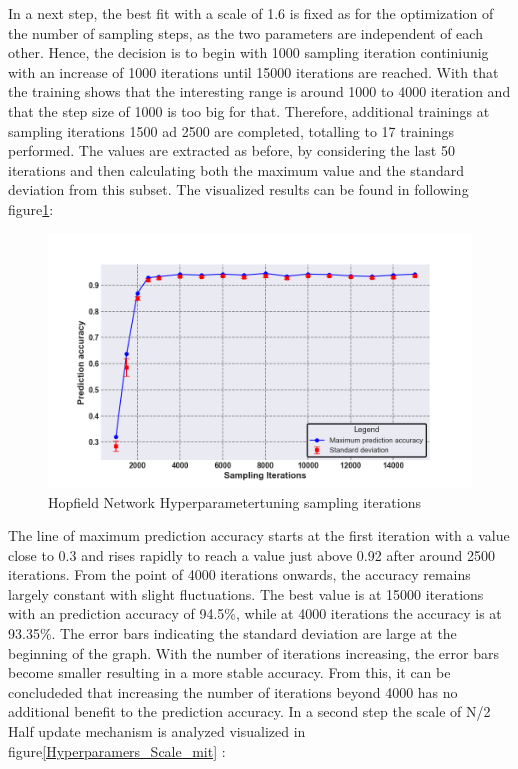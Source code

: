 In a next step, the best fit with a scale of 1.6 is fixed as for the optimization of the number of sampling steps, as the two parameters are independent of each other. 
Hence, the decision is to begin with 1000 sampling iteration continiunig with an increase of 1000 iterations until 15000 iterations are reached. 
With that the training shows that the interesting range is around 1000 to 4000 iteration and that the step size of 1000 is too big for that. 
Therefore, additional trainings at sampling iterations 1500 ad 2500 are completed, totalling to 17 trainings performed.
The values are extracted as before, by considering the last 50 iterations and then calculating both the maximum value and the standard deviation from this subset.
The visualized results can be found in following figure\ref{Hyperparamers_Iteraions_ohne}:
\begin{figure}[H]
    \centering
    \includegraphics[width=0.8\linewidth]{graphics/Iterations_Ohne_N2_Half_Pred_Acc.png}
    \caption{Hopfield Network Hyperparametertuning sampling iterations}
    \label{Hyperparamers_Iteraions_ohne}
\end{figure}
The line of maximum prediction accuracy starts at the first iteration with a value close to 0.3 and rises rapidly to reach a value just above 0.92 after around 2500 iterations.
From the point of 4000 iterations onwards, the accuracy remains largely constant with slight fluctuations.
The best value is at 15000 iterations with an prediction accuracy of 94.5\%, while at 4000 iterations the accuracy is at 93.35\%.
The error bars indicating the standard deviation are large at the beginning of the graph.
With the number of iterations increasing, the error bars become smaller resulting in a more stable accuracy.
From this, it can be concludeded that increasing the number of iterations beyond 4000 has no additional benefit to the prediction accuracy. 
In a second step the scale of N/2 Half update mechanism is analyzed visualized in figure\ref{Hyperparamers_Scale_mit} :
